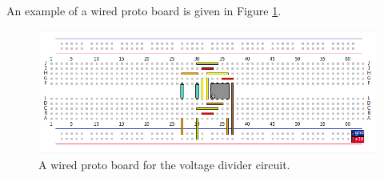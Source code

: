 \documentclass[12pt]{amsart}
\begin{document}
An example of a wired proto board is given in Figure \ref{fig:wired}.

\begin{figure}
\includegraphics[width=\linewidth]{Images/Wired_Proto_Board.png}
\caption{A wired proto board for the voltage divider circuit.}
\label{fig:wired}
\end{figure}
\end{document}
